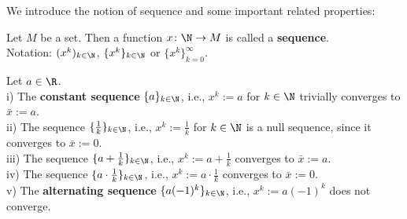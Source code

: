 \begin{frame}
We introduce the notion of sequence and some important related properties: \vspace{-0.2cm}
\begin{defi}[Sequence]\label{def:sequence}
 Let $M$ be a set. Then a function $x\colon \N \to M$ is called a \textbf{sequence}.\\ Notation: $(x^k)_{k\in \N}$, $\{x^k\}_{k\in \N}$ or $\{x^k\}_{k=0}^\infty$.
\end{defi}
\vspace{0.3cm}
\begin{ex} \blank 
	Let $a \in \R$.\\
	i)  The \textbf{constant sequence} $\{a\}_{k\in\N}$, i.e., $x^k := a$ for $k\in \N$ trivially converges to $\bar{x} := a$. \\
	ii) The sequence $\{\frac{1}{k}\}_{k\in\N}$, i.e.,  $x^k := \frac{1}{k}$ for $k\in \N$ is a null sequence, since it converges to $\bar{x} := 0$.\\
	iii) The sequence $\{a + \frac{1}{k}\}_{k\in\N}$, i.e.,  $x^k := a + \frac{1}{k}$ converges to $\bar{x} := a$.\\
	iv) The sequence $\{a \cdot\frac{1}{k}\}_{k\in\N}$, i.e.,  $x^k := a \cdot \frac{1}{k}$ converges to $\bar{x} := 0$.\\
	v) The \textbf{alternating sequence} $\{a (-1)^k\}_{k\in\N}$, i.e.,  $x^k := a (-1)^k$ does not converge.
\end{ex}
\end{frame}

